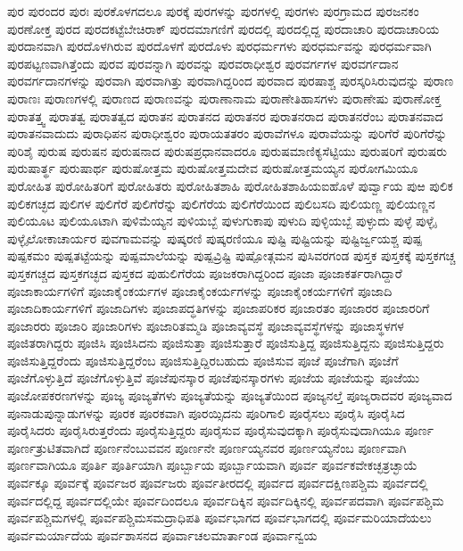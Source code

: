 {ಪುರ
ಪುರಂದರ
ಪುರಃ
ಪುರಕೊಳಗದಲೂ
ಪುರಕ್ಕೆ
ಪುರಗಳನ್ನು
ಪುರಗಳಲ್ಲಿ
ಪುರಗಳು
ಪುರಗ್ರಾಮದ
ಪುರಜನಕಂ
ಪುರಣೋಕ್ತ
ಪುರದ
ಪುರದಕಟ್ಟೆಬೇಚಿರಾಕ್
ಪುರದಮಾಗಣಿಗೆ
ಪುರದಲ್ಲಿ
ಪುರದಲ್ಲಿದ್ದ
ಪುರದಾಚಾರಿ
ಪುರದಾಚಾರಿಯ
ಪುರದಾನವಾಗಿ
ಪುರದೊಳಗಿರುವ
ಪುರದೊಳಗೆ
ಪುರದೊಳು
ಪುರಧರ್ಮಗಳು
ಪುರಧರ್ಮವನ್ನು
ಪುರಧರ್ಮವಾಗಿ
ಪುರಪಟ್ಟಣವಾಗಿತ್ತೆಂದು
ಪುರವ
ಪುರವನ್ನಾಗಿ
ಪುರವನ್ನು
ಪುರವರಾಧೀಶ್ವರ
ಪುರವರ್ಗಗಳ
ಪುರವರ್ಗದಾನ
ಪುರವರ್ಗದಾನಗಳನ್ನು
ಪುರವಾಗಿ
ಪುರವಾಗಿತ್ತು
ಪುರವಾಗಿದ್ದರಿಂದ
ಪುರವಾದ
ಪುರಷಾಶ್ಚ
ಪುರಸ್ಕರಿಸಿರುವುದನ್ನು
ಪುರಾಣ
ಪುರಾಣಃ
ಪುರಾಣಗಳಲ್ಲಿ
ಪುರಾಣದ
ಪುರಾಣವನ್ನು
ಪುರಾಣಾನಾಮ
ಪುರಾಣೇತಿಹಾಸಗಳು
ಪುರಾಣೇಷು
ಪುರಾಣೋಕ್ತ
ಪುರಾತತ್ತ್ವ
ಪುರಾತತ್ವ
ಪುರಾತತ್ವದ
ಪುರಾತನ
ಪುರಾತನದ
ಪುರಾತನರ
ಪುರಾತನರಾದ
ಪುರಾತನರೆಂಬ
ಪುರಾತನವಾದ
ಪುರಾತನವಾದುದು
ಪುರಾಧಿಪನ
ಪುರಾಧೀಶ್ವರಂ
ಪುರಾಯತತರಂ
ಪುರಾವೆಗಳೂ
ಪುರಾವೆಯನ್ನು
ಪುರಿಗೆರೆ
ಪುರಿಗೆರೆನ್ನು
ಪುರಿಶೈ
ಪುರುಷ
ಪುರುಷನ
ಪುರುಷನಾದ
ಪುರುಷಪ್ರಧಾನವಾದರೂ
ಪುರುಷಮಾಣಿಕ್ಯಸೆಟ್ಟಿಯು
ಪುರುಷರಿಗೆ
ಪುರುಷರು
ಪುರುಷಾರ್ತ್ಥ
ಪುರುಷಾರ್ಥ
ಪುರುಷೋತ್ತಮ
ಪುರುಷೋತ್ತಮದೇವ
ಪುರುಷೋತ್ತಮಯ್ಯನ
ಪುರೋಗಮಿಯೂ
ಪುರೋಹಿತ
ಪುರೋಹಿತರಿಗೆ
ಪುರೋಹಿತರು
ಪುರೋಹಿತಶಾಹಿ
ಪುರೋಹಿತಶಾಹಿಯಐಹೊಳೆ
ಪುರ್ವ್ವಾಯ
ಪುಱ
ಪುಲಿಕ
ಪುಲಿಕಗಚ್ಛದ
ಪುಲಿಗಳ
ಪುಲಿಗೆರೆ
ಪುಲಿಗೆರೆನ್ನು
ಪುಲಿಗೆರೆಯ
ಪುಲಿಗೆರೆಯಿಂದ
ಪುಲಿಬಸದಿ
ಪುಲಿಯಣ್ಣ
ಪುಲಿಯಣ್ಣನ
ಪುಲಿಯೂಟ
ಪುಲಿಯೂಟಾಗಿ
ಪುಳಿಮೆಯ್ಯನ
ಪುಳಿಯಬ್ಬೆ
ಪುಳುಗುಕಾಪು
ಪುಳುದಿ
ಪುಳ್ಳಿಯಬ್ಬೆ
ಪುಳ್ಳುದು
ಪುಳ್ಳೆ
ಪುಳ್ಳೈ
ಪುಳ್ಳೈಲೋಕಾಚಾರ್ಯರ
ಪುವಗಾಮವನ್ನು
ಪುಷ್ಕರಣಿ
ಪುಷ್ಕರಣಿಯೂ
ಪುಷ್ಟಿ
ಪುಷ್ಟಿಯನ್ನು
ಪುಷ್ಟಿರ್ಜ್ವಯಶ್ಚ
ಪುಷ್ಪ
ಪುಷ್ಪಕಮಂ
ಪುಷ್ಪತಟ್ಟೆಯನ್ನು
ಪುಷ್ಪಮಾಲೆಯನ್ನು
ಪುಷ್ಪವ್ರಿಷ್ಟಿ
ಪುಷ್ಪೋತ್ಗಮನ
ಪುಸಿವರಗಂಡ
ಪುಸ್ತಕ
ಪುಸ್ತಕಕ್ಕೆ
ಪುಸ್ತಕಗಚ್ಚ
ಪುಸ್ತಕಗಚ್ಚದ
ಪುಸ್ತಕಗಚ್ಛದ
ಪುಸ್ತಕದ
ಪುಹುಲಿಗೆರೆಯ
ಪೂಜಕರಾಗಿದ್ದರಿಂದ
ಪೂಜಾ
ಪೂಜಾಕರ್ತರಾಗಿದ್ದಾರೆ
ಪೂಜಾಕಾರ್ಯಗಳಿಗೆ
ಪೂಜಾಕೈಂಕರ್ಯಗಳ
ಪೂಜಾಕೈಂಕರ್ಯಗಳನ್ನು
ಪೂಜಾಕೈಂಕರ್ಯಗಳಿಗೆ
ಪೂಜಾದಿ
ಪೂಜಾದಿಕಾರ್ಯಗಳಿಗೆ
ಪೂಜಾದಿಗಳು
ಪೂಜಾಪದ್ಧತಿಗಳನ್ನು
ಪೂಜಾಪರಿಕರ
ಪೂಜಾರತಂ
ಪೂಜಾರರ
ಪೂಜಾರರಿಗೆ
ಪೂಜಾರರು
ಪೂಜಾರಿ
ಪೂಜಾರಿಗಳು
ಪೂಜಾರಿತಮ್ಮಡಿ
ಪೂಜಾವ್ಯವಸ್ಥೆ
ಪೂಜಾವ್ಯವಸ್ಥೆಗಳನ್ನು
ಪೂಜಾಸ್ಥಳಗಳ
ಪೂಜಿತರಾಗಿದ್ದರು
ಪೂಜಿಸಿ
ಪೂಜಿಸಿದನು
ಪೂಜಿಸುತ್ತಾ
ಪೂಜಿಸುತ್ತಾರೆ
ಪೂಜಿಸುತ್ತಿದ್ದ
ಪೂಜಿಸುತ್ತಿದ್ದನು
ಪೂಜಿಸುತ್ತಿದ್ದರು
ಪೂಜಿಸುತ್ತಿದ್ದರೆಂದು
ಪೂಜಿಸುತ್ತಿದ್ದರೆಂಬ
ಪೂಜಿಸುತ್ತಿದ್ದಿರಬಹುದು
ಪೂಜಿಸುವ
ಪೂಜೆ
ಪೂಜೆಗಾಗಿ
ಪೂಜೆಗೆ
ಪೂಜೆಗೊಳ್ಳುತ್ತಿದೆ
ಪೂಜೆಗೊಳ್ಳುತ್ತಿವೆ
ಪೂಜೆಪುನಸ್ಕಾರ
ಪೂಜೆಪುನಸ್ಕಾರಗಳು
ಪೂಜೆಯ
ಪೂಜೆಯನ್ನು
ಪೂಜೆಯು
ಪೂಜೋಪಕರಣಗಳನ್ನು
ಪೂಜ್ಯ
ಪೂಜ್ಯತೆಗಳು
ಪೂಜ್ಯತೆಯನ್ನು
ಪೂಜ್ಯತೆಯಿಂದ
ಪೂಜ್ಯನಲ್ತೆ
ಪೂಜ್ಯರಾದವರ
ಪೂಜ್ಯವಾದ
ಪೂನಾಡುಪುನ್ನಾಡುಗಳನ್ನು
ಪೂರಕ
ಪೂರಕವಾಗಿ
ಪೂರಯ್ಸಿದನು
ಪೂರಿಗಾಲಿ
ಪೂರೈಸಲು
ಪೂರೈಸಿ
ಪೂರೈಸಿದ
ಪೂರೈಸಿದರು
ಪೂರೈಸಿರುತ್ತರೆಂದು
ಪೂರೈಸುತ್ತಿದ್ದರು
ಪೂರೈಸುವ
ಪೂರೈಸುವುದಕ್ಕಾಗಿ
ಪೂರೈಸುವುದಾಗಿಯೂ
ಪೂರ್ಣ
ಪೂರ್ಣತ್ರುಟಿತವಾಗಿದೆ
ಪೂರ್ಣನೆಂಬುವವನ
ಪೂರ್ಣನೇ
ಪೂರ್ಣಯ್ಯನವರ
ಪೂರ್ಣಯ್ಯನೆಂಬ
ಪೂರ್ಣವಾಗಿ
ಪೂರ್ಣವಾಗಿಯೂ
ಪೂರ್ತಿ
ಪೂರ್ತಿಯಾಗಿ
ಪೂರ್ಬ್ಬಾಯ
ಪೂರ್ಬ್ಬಾಯವಾಗಿ
ಪೂರ್ವ
ಪೂರ್ವಕವೇಕಚ್ಛತ್ರಚ್ಛಾಯೆ
ಪೂರ್ವಕ್ಕೂ
ಪೂರ್ವಕ್ಕೆ
ಪೂರ್ವಜರ
ಪೂರ್ವಜರು
ಪೂರ್ವತೀರದಲ್ಲಿ
ಪೂರ್ವದ
ಪೂರ್ವದಕ್ಷಿಣಪಶ್ಚಿಮ
ಪೂರ್ವದಲ್ಲಿ
ಪೂರ್ವದಲ್ಲಿದ್ದ
ಪೂರ್ವದಲ್ಲಿಯೇ
ಪೂರ್ವದಿಂದಲೂ
ಪೂರ್ವದಿಕ್ಕಿನ
ಪೂರ್ವದಿಕ್ಕಿನಲ್ಲಿ
ಪೂರ್ವಪದವಾಗಿ
ಪೂರ್ವಪಶ್ಚಿಮ
ಪೂರ್ವಪಶ್ಚಿಮಗಳಲ್ಲಿ
ಪೂರ್ವಪಶ್ಚಿಮಸಮದ್ರಾಧಿಪತಿ
ಪೂರ್ವಭಾಗದ
ಪೂರ್ವಭಾಗದಲ್ಲಿ
ಪೂರ್ವಮರಿಯಾದೆಯಲು
ಪೂರ್ವಮರ್ಯಾದೆಯ
ಪೂರ್ವಶಾಸನದ
ಪೂರ್ವಾಚಲಮಾರ್ತಾಂಡ
ಪೂರ್ವಾನ್ವಯ
}
